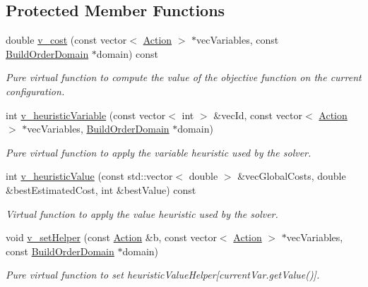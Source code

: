 \subsection*{Protected Member Functions}
\begin{DoxyCompactItemize}
\item 
double \hyperlink{classghost_1_1BuildOrderObjective_a2d76e1734085c9775af4784b6d29dd12}{v\-\_\-cost} (const vector$<$ \hyperlink{classghost_1_1Action}{Action} $>$ $\ast$vec\-Variables, const \hyperlink{classghost_1_1BuildOrderDomain}{Build\-Order\-Domain} $\ast$domain) const 
\begin{DoxyCompactList}\small\item\em Pure virtual function to compute the value of the objective function on the current configuration. \end{DoxyCompactList}\item 
int \hyperlink{classghost_1_1BuildOrderObjective_a3704745355d6bf12a3afe2e8d551f38a}{v\-\_\-heuristic\-Variable} (const vector$<$ int $>$ \&vec\-Id, const vector$<$ \hyperlink{classghost_1_1Action}{Action} $>$ $\ast$vec\-Variables, \hyperlink{classghost_1_1BuildOrderDomain}{Build\-Order\-Domain} $\ast$domain)
\begin{DoxyCompactList}\small\item\em Pure virtual function to apply the variable heuristic used by the solver. \end{DoxyCompactList}\item 
int \hyperlink{classghost_1_1BuildOrderObjective_ac53eb5d747fff00a064b6c45f02a99ee}{v\-\_\-heuristic\-Value} (const std\-::vector$<$ double $>$ \&vec\-Global\-Costs, double \&best\-Estimated\-Cost, int \&best\-Value) const 
\begin{DoxyCompactList}\small\item\em Virtual function to apply the value heuristic used by the solver. \end{DoxyCompactList}\item 
void \hyperlink{classghost_1_1BuildOrderObjective_ad76dc815275350590eb67db1d22cc02b}{v\-\_\-set\-Helper} (const \hyperlink{classghost_1_1Action}{Action} \&b, const vector$<$ \hyperlink{classghost_1_1Action}{Action} $>$ $\ast$vec\-Variables, const \hyperlink{classghost_1_1BuildOrderDomain}{Build\-Order\-Domain} $\ast$domain)
\begin{DoxyCompactList}\small\item\em Pure virtual function to set heuristic\-Value\-Helper\mbox{[}current\-Var.\-get\-Value()\mbox{]}. \end{DoxyCompactList}\item 

\end{DoxyCompactItemize}
